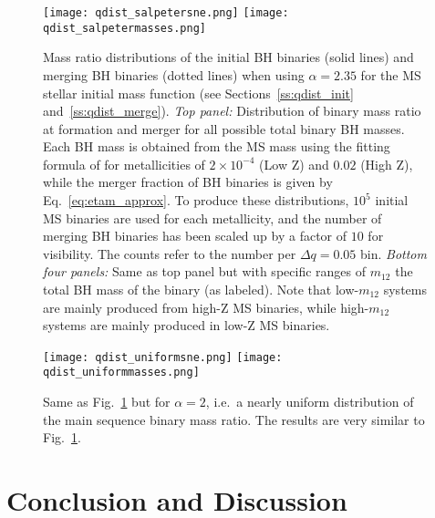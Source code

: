 \documentclass[
        fleqn,
        usenatbib,
    ]{mnras}
\begin{document}
\begin{figure}
    \centering
    \texttt{[image: qdist\_salpetersne.png]}
    \texttt{[image: qdist\_salpetermasses.png]}
    \caption{Mass ratio distributions of the initial BH binaries (solid lines)
    and merging BH binaries (dotted lines) when using $\alpha = 2.35$ for the MS
    stellar initial mass function (see Sections~\ref{ss:qdist_init}
    and~\ref{ss:qdist_merge}). \emph{Top panel:} Distribution of binary mass
    ratio at formation and merger for all possible total binary BH masses. Each
    BH mass is obtained from the MS mass using the fitting formula of
    \citet{spera2017very} for metallicities of $2 \times 10^{-4}$ (Low Z) and
    $0.02$ (High Z), while the merger fraction of BH binaries is given by
    Eq.~\eqref{eq:etam_approx}. To produce these distributions, $10^5$ initial
    MS binaries are used for each metallicity, and the number of merging BH
    binaries has been scaled up by a factor of $10$ for visibility. The counts
    refer to the number per $\Delta q = 0.05$ bin. \emph{Bottom four panels:}
    Same as top panel but with specific ranges of $m_{12}$ the total BH mass of
    the binary (as labeled). Note that low-$m_{12}$ systems are mainly produced
    from high-Z MS binaries, while high-$m_{12}$ systems are mainly produced in
    low-Z MS binaries. }\label{fig:qdist_salpeter}
\end{figure}
\begin{figure}
    \centering
    \texttt{[image: qdist\_uniformsne.png]}
    \texttt{[image: qdist\_uniformmasses.png]}
    \caption{Same as Fig.~\ref{fig:qdist_salpeter} but for $\alpha = 2$, i.e.\ a
    nearly uniform distribution of the main sequence binary mass
    ratio. The results are very similar to Fig.~\ref{fig:qdist_salpeter}.
    }\label{fig:qdist_uniform}
\end{figure}

\section{Conclusion and Discussion}\label{s:conclusion}
\end{document}
